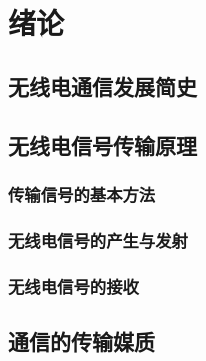 \chapter{绪论}

\section{无线电通信发展简史}



\section{无线电信号传输原理}

\subsection{传输信号的基本方法}



\subsection{无线电信号的产生与发射}



\subsection{无线电信号的接收}



\section{通信的传输媒质}



